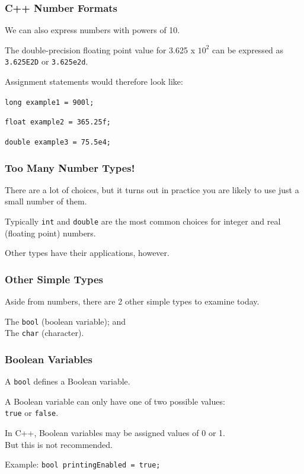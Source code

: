 \begin{frame}
\frametitle{C++ Number Formats}

We can also express numbers with powers of 10.

The double-precision floating point value for 3.625 x $10^{2}$ can be expressed as \texttt{3.625E2D} or \texttt{3.625e2d}.


Assignment statements would therefore look like:

\texttt{long example1 = 900l;}

\texttt{float example2 = 365.25f;}

\texttt{double example3 = 75.5e4;}


\end{frame}


\begin{frame}
\frametitle{Too Many Number Types!}

There are a lot of choices, but it turns out in practice you are likely to use just a small number of them.

Typically \texttt{int} and \texttt{double} are the most common choices for integer and real (floating point) numbers.

Other types have their applications, however.

\end{frame}

\begin{frame}
\frametitle{Other Simple Types}

Aside from numbers, there are 2 other simple types to examine today.

The \texttt{bool} (boolean variable); and \\
The \texttt{char} (character).

\end{frame}

\begin{frame}
\frametitle{Boolean Variables}

A \texttt{bool} defines a Boolean variable.

A Boolean variable can only have one of two possible values: \\
\quad \texttt{true} or \texttt{false}.

In C++, Boolean variables may be assigned values of 0 or 1.\\
\quad But this is not recommended.

Example: \texttt{bool printingEnabled = true;}

\end{frame}


